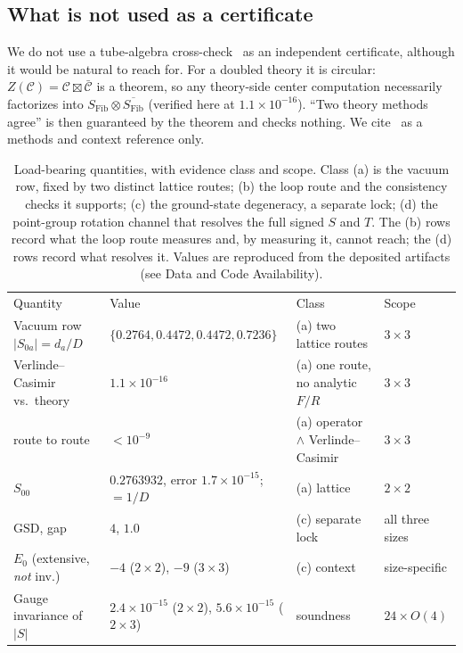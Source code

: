 \documentclass[aps,pra,twocolumn,superscriptaddress,longbibliography,floatfix,nofootinbib]{revtex4-2}
\begin{document}
\subsection{What is not used as a certificate}
\label{sec:tube}

We do not use a tube-algebra cross-check~\cite{Bultinck2017} as an independent
certificate, although it would be natural to reach for. For a doubled theory it
is circular: $Z(\mathcal{C})=\mathcal{C}\boxtimes\bar{\mathcal{C}}$ is a
theorem, so any theory-side center computation necessarily factorizes into
$S_{\mathrm{Fib}}\otimes\overline{S_{\mathrm{Fib}}}$ (verified here at
$1.1\times10^{-16}$). ``Two theory methods agree'' is then guaranteed by the
theorem and checks nothing. We cite~\cite{Bultinck2017} as a
methods and context reference only.

\begin{table}[tp]
\caption{\label{tab:numbers}Load-bearing quantities, with evidence class and
scope. Class (a) is the vacuum row, fixed by two distinct lattice routes; (b)
the loop route and the consistency checks it supports; (c) the ground-state
degeneracy, a separate lock; (d) the point-group rotation channel that resolves
the full signed $S$ and $T$. The (b) rows record what the loop route measures
and, by measuring it, cannot reach; the (d) rows record what resolves it.
Values are reproduced from the deposited artifacts (see Data and Code
Availability).}
\begin{ruledtabular}
\scriptsize
\begin{tabular}{llll}
Quantity & Value & Class & Scope \\
\colrule
Vacuum row $|S_{0a}|=d_a/D$ & $\{0.2764,0.4472,0.4472,0.7236\}$ & (a) two lattice routes & $3\times3$ \\
\quad Verlinde--Casimir vs.\ theory & $1.1\times10^{-16}$ & (a) one route, no analytic $F/R$ & $3\times3$ \\
\quad route to route & $<10^{-9}$ & (a) operator $\wedge$ Verlinde--Casimir & $3\times3$ \\
$S_{00}$ & $0.2763932$, error $1.7\times10^{-15}$; $=1/D$ & (a) lattice & $2\times2$ \\
$\mathrm{GSD}$, gap & $4$, $1.0$ & (c) separate lock & all three sizes \\
$E_0$ (extensive, \emph{not} inv.) & $-4$ ($2\times2$), $-9$ ($3\times3$) & (c) context & size-specific \\
Gauge invariance of $|S|$ & $2.4\times10^{-15}$ ($2\times2$), $5.6\times10^{-15}$ ($2\times3$) & soundness & $24\times O(4)$ \\

\end{tabular}
\end{ruledtabular}
\end{table}
\end{document}
